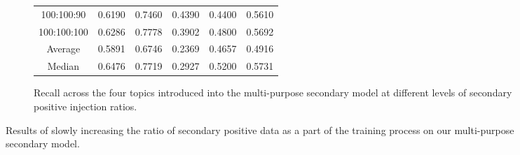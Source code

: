 \begin{figure}[ht]
\begin{subfigure}{\textwidth}
{\begin{tabular}{cccccc}
                100:100:90                             & 0.6190           & 0.7460           & 0.4390           & 0.4400            & 0.5610          \\
                100:100:100                            & 0.6286           & 0.7778           & 0.3902           & 0.4800            & 0.5692          \\
                \midrule
                Average                                & 0.5891           & 0.6746           & 0.2369           & 0.4657            & 0.4916          \\
                Median                                 & 0.6476           & 0.7719           & 0.2927           & 0.5200            & 0.5731          \\
                \bottomrule
            \end{tabular}%
        }
        \caption{Recall across the four topics introduced into the multi-purpose secondary model at different levels of secondary positive injection ratios.}
        \label{subfig:ratio_test_combined_recall}
    \end{subfigure}

    \caption{Results of slowly increasing the ratio of secondary positive data as a part of the training process on our multi-purpose secondary model.}
    \label{fig:ratio_test_combined_model}
\end{figure}

